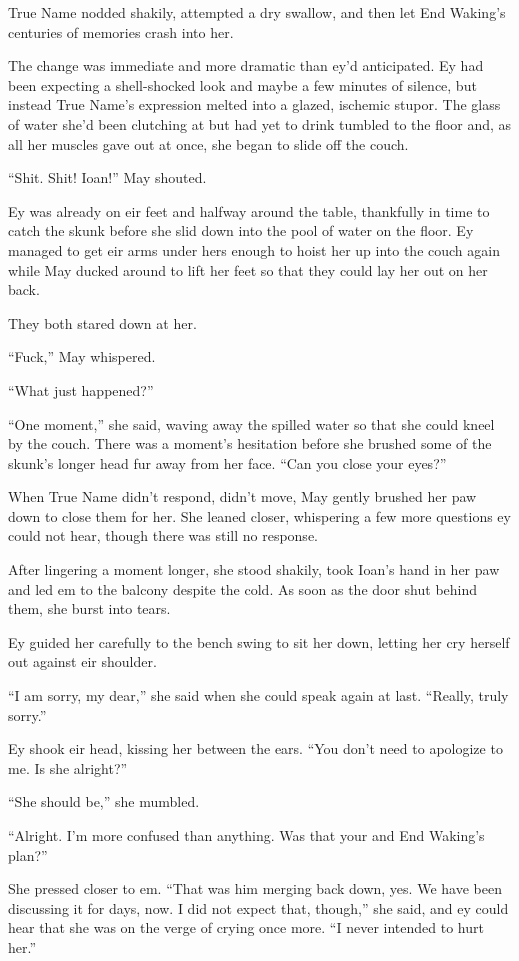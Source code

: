 True Name nodded shakily, attempted a dry swallow, and then let End Waking's centuries of memories crash into her.

The change was immediate and more dramatic than ey'd anticipated. Ey had been expecting a shell-shocked look and maybe a few minutes of silence, but instead True Name's expression melted into a glazed, ischemic stupor. The glass of water she'd been clutching at but had yet to drink tumbled to the floor and, as all her muscles gave out at once, she began to slide off the couch.

``Shit. Shit! Ioan!'' May shouted.

Ey was already on eir feet and halfway around the table, thankfully in time to catch the skunk before she slid down into the pool of water on the floor. Ey managed to get eir arms under hers enough to hoist her up into the couch again while May ducked around to lift her feet so that they could lay her out on her back.

They both stared down at her.

``Fuck,'' May whispered.

``What just happened?''

``One moment,'' she said, waving away the spilled water so that she could kneel by the couch. There was a moment's hesitation before she brushed some of the skunk's longer head fur away from her face. ``Can you close your eyes?''

When True Name didn't respond, didn't move, May gently brushed her paw down to close them for her. She leaned closer, whispering a few more questions ey could not hear, though there was still no response.

After lingering a moment longer, she stood shakily, took Ioan's hand in her paw and led em to the balcony despite the cold. As soon as the door shut behind them, she burst into tears.

Ey guided her carefully to the bench swing to sit her down, letting her cry herself out against eir shoulder.

``I am sorry, my dear,'' she said when she could speak again at last. ``Really, truly sorry.''

Ey shook eir head, kissing her between the ears. ``You don't need to apologize to me. Is she alright?''

``She should be,'' she mumbled.

``Alright. I'm more confused than anything. Was that your and End Waking's plan?''

She pressed closer to em. ``That was him merging back down, yes. We have been discussing it for days, now. I did not expect that, though,'' she said, and ey could hear that she was on the verge of crying once more. ``I never intended to hurt her.''

